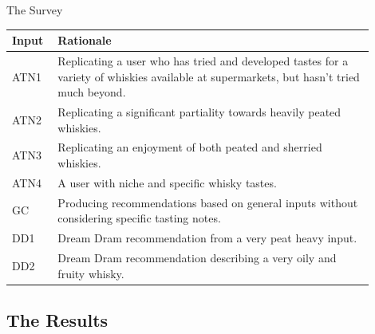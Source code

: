 \documentclass{beamer}
\begin{document}
\begin{frame}{The Survey}
    \begin{table}
        \centering
        \begin{tabular}{p{0.1\linewidth} p{0.8\linewidth}} 
        \toprule
        Input & Rationale                                                                                                                                 \\ 
        \hline
        ATN1            & Replicating a user who has tried and developed tastes for a variety of whiskies available at supermarkets, but hasn't tried much beyond.  \\
        ATN2            & Replicating a significant partiality towards heavily peated whiskies.                                                                     \\
        ATN3            & Replicating an enjoyment of both peated and sherried whiskies.                                                                            \\
        ATN4            & A user with niche and specific whisky tastes.                                                                                             \\
        GC              & Producing recommendations based on general inputs without considering specific tasting notes.                                            \\
        DD1             & Dream Dram recommendation from a very peat heavy input.                                                                                   \\
        DD2             & Dream Dram recommendation describing a very oily and fruity whisky.                                                                       \\
        \bottomrule
        \end{tabular}
    \end{table}
\end{frame}

\subsection{The Results}
\end{document}
